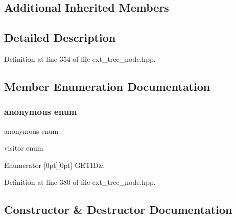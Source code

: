 \subsection*{Additional Inherited Members}


\subsection{Detailed Description}


Definition at line 354 of file ext\+\_\+tree\+\_\+node.\+hpp.



\subsection{Member Enumeration Documentation}
\mbox{\label{structomp__parallel__pragma_a5fc55c671a3ff207948c6eeb3403d05c}} 
\subsubsection{\texorpdfstring{anonymous enum}{anonymous enum}}
{\footnotesize\ttfamily anonymous enum}



visitor enum 

\begin{DoxyEnumFields}{Enumerator}
[0pt][0pt]{}\mbox{\label{structomp__parallel__pragma_a5fc55c671a3ff207948c6eeb3403d05cad56907e23fbfa7587f3a237efc615d42}} 
G\+E\+T\+ID&\\
\hline

\end{DoxyEnumFields}


Definition at line 380 of file ext\+\_\+tree\+\_\+node.\+hpp.



\subsection{Constructor \& Destructor Documentation}
\mbox{\label{structomp__parallel__pragma_a48290ef1b23c267b3586e9f8bf2a8f85}} 
